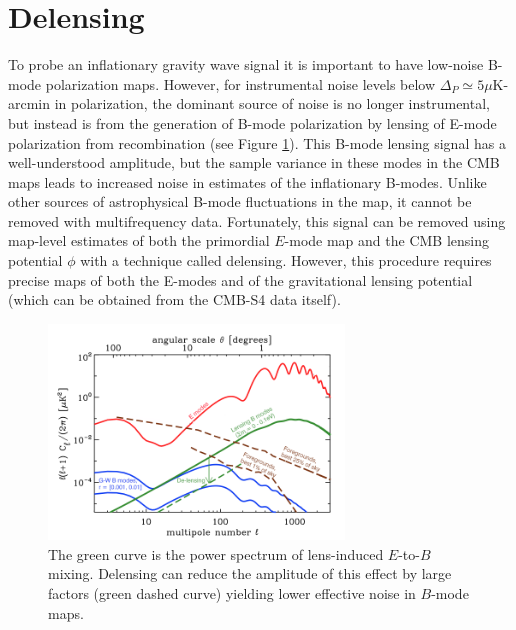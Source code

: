 


\section{Delensing}\label{delens}

To probe an inflationary gravity wave signal it is important to have low-noise B-mode polarization maps. However, for instrumental noise levels below $\Delta_P \simeq 5 \mu$K-arcmin in polarization, the dominant source of noise is no longer instrumental, but instead is from the generation of B-mode polarization
by lensing of E-mode polarization from recombination (see Figure \ref{snowmssDelens}).  This B-mode lensing signal has a well-understood amplitude, but the 
sample variance in these modes in the CMB maps leads to 
increased noise in estimates of the inflationary B-modes. Unlike other sources of astrophysical B-mode fluctuations in the map, it cannot be removed with multifrequency data.  Fortunately, this signal can be removed using map-level 
estimates of both the primordial $E$-mode map and the CMB lensing potential $\phi$ with a technique called delensing. However, this procedure requires
precise maps of both the E-modes and of the gravitational lensing potential
(which can be obtained from the CMB-S4 data itself).

\begin{figure}[htbp]
\centering
\includegraphics[width=0.70\textwidth]{CMBLensing/Delensing.png}
\caption{The green curve is the power spectrum of lens-induced $E$-to-$B$ mixing.  Delensing can reduce the amplitude of this effect by large factors (green dashed curve) yielding lower effective noise in $B$-mode maps.}
\label{snowmssDelens}
\end{figure}

